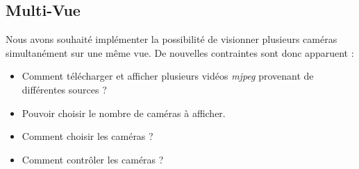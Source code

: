 \subsection{Multi-Vue}
Nous avons souhaité implémenter la possibilité de visionner plusieurs caméras
simultanément sur une même vue. De nouvelles contraintes sont donc apparuent : 
\begin{itemize}
  \item Comment télécharger et afficher plusieurs vidéos \textit{mjpeg}
  provenant de différentes sources ?
  \item Pouvoir choisir le nombre de caméras à afficher.
  \item Comment choisir les caméras ?
  \item Comment contrôler les caméras ?
\end{itemize}

